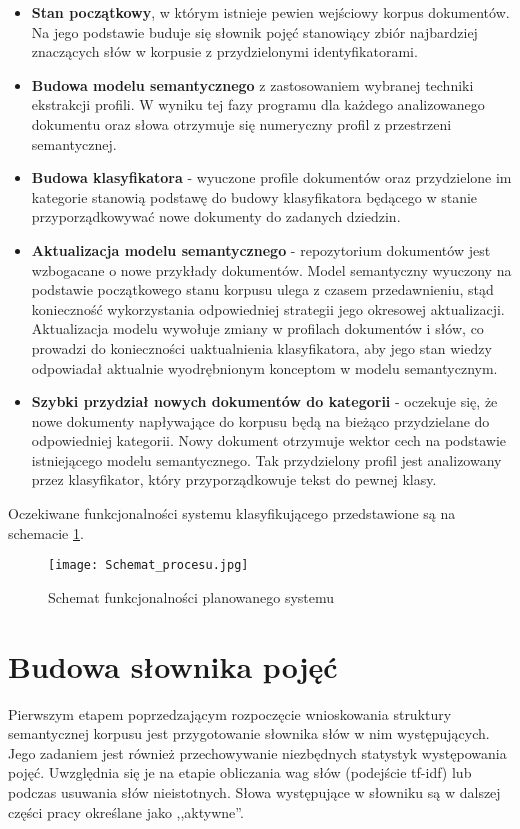 \documentclass{pracamgr}
\begin{document}
\begin{itemize}
    \item \textbf{Stan początkowy}, w którym istnieje pewien wejściowy korpus dokumentów. Na jego podstawie buduje się słownik pojęć stanowiący zbiór najbardziej znaczących słów w korpusie z przydzielonymi identyfikatorami.
    \item \textbf{Budowa modelu semantycznego} z zastosowaniem wybranej techniki ekstrakcji profili. W wyniku tej fazy programu dla każdego analizowanego dokumentu oraz słowa otrzymuje się numeryczny profil z przestrzeni semantycznej.
    \item \textbf{Budowa klasyfikatora} - wyuczone profile dokumentów oraz przydzielone im kategorie stanowią podstawę do budowy klasyfikatora będącego w stanie przyporządkowywać nowe dokumenty do zadanych dziedzin.
    \item \textbf{Aktualizacja modelu semantycznego} - repozytorium dokumentów jest wzbogacane o nowe przykłady dokumentów. Model semantyczny wyuczony na podstawie początkowego stanu korpusu ulega z czasem przedawnieniu, stąd konieczność wykorzystania odpowiedniej strategii jego okresowej aktualizacji. Aktualizacja modelu wywołuje zmiany w profilach dokumentów i słów, co prowadzi do konieczności uaktualnienia klasyfikatora, aby jego stan wiedzy odpowiadał aktualnie wyodrębnionym konceptom w modelu semantycznym.
    \item \textbf{Szybki przydział nowych dokumentów do kategorii} - oczekuje się, że nowe dokumenty napływające do korpusu będą na bieżąco przydzielane do odpowiedniej kategorii. Nowy dokument otrzymuje wektor cech na podstawie istniejącego modelu semantycznego. Tak przydzielony profil jest analizowany przez klasyfikator, który przyporządkowuje tekst do pewnej klasy.
    
\end{itemize}

Oczekiwane funkcjonalności systemu klasyfikującego przedstawione są na schemacie \ref{classification_approach}.

\begin{figure}
    \centering
    \texttt{[image: Schemat\_procesu.jpg]}
    \caption{Schemat funkcjonalności planowanego systemu}
    \label{classification_approach}
\end{figure}

\section{Budowa słownika pojęć}
Pierwszym etapem poprzedzającym rozpoczęcie wnioskowania struktury semantycznej korpusu jest przygotowanie słownika słów w nim występujących. Jego zadaniem jest również przechowywanie niezbędnych statystyk występowania pojęć. Uwzględnia się je na etapie obliczania wag słów (podejście tf-idf) lub podczas usuwania słów nieistotnych. Słowa występujące w słowniku są w dalszej części pracy określane jako ,,aktywne''.
\end{document}
